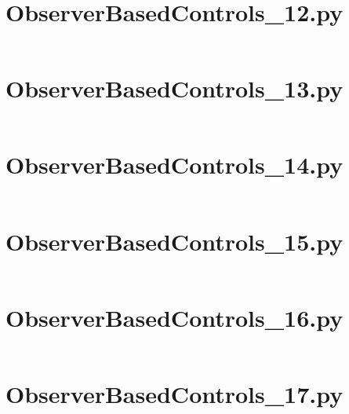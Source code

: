 \pagebreak
\section*{ObserverBasedControls\_12.py}\label{code:TSatPySamples/ObserverBasedControls_12.py}\inputminted[linenos,fontsize=\scriptsize]{python}{/home/dcouture/git/mathyourlife/TSatPy/tex/sample_scripts/ObserverBasedControls_12.py}

\pagebreak
\section*{ObserverBasedControls\_13.py}\label{code:TSatPySamples/ObserverBasedControls_13.py}\inputminted[linenos,fontsize=\scriptsize]{python}{/home/dcouture/git/mathyourlife/TSatPy/tex/sample_scripts/ObserverBasedControls_13.py}

\pagebreak
\section*{ObserverBasedControls\_14.py}\label{code:TSatPySamples/ObserverBasedControls_14.py}\inputminted[linenos,fontsize=\scriptsize]{python}{/home/dcouture/git/mathyourlife/TSatPy/tex/sample_scripts/ObserverBasedControls_14.py}

\pagebreak
\section*{ObserverBasedControls\_15.py}\label{code:TSatPySamples/ObserverBasedControls_15.py}\inputminted[linenos,fontsize=\scriptsize]{python}{/home/dcouture/git/mathyourlife/TSatPy/tex/sample_scripts/ObserverBasedControls_15.py}

\pagebreak
\section*{ObserverBasedControls\_16.py}\label{code:TSatPySamples/ObserverBasedControls_16.py}\inputminted[linenos,fontsize=\scriptsize]{python}{/home/dcouture/git/mathyourlife/TSatPy/tex/sample_scripts/ObserverBasedControls_16.py}

\pagebreak
\section*{ObserverBasedControls\_17.py}\label{code:TSatPySamples/ObserverBasedControls_17.py}\inputminted[linenos,fontsize=\scriptsize]{python}{/home/dcouture/git/mathyourlife/TSatPy/tex/sample_scripts/ObserverBasedControls_17.py}

